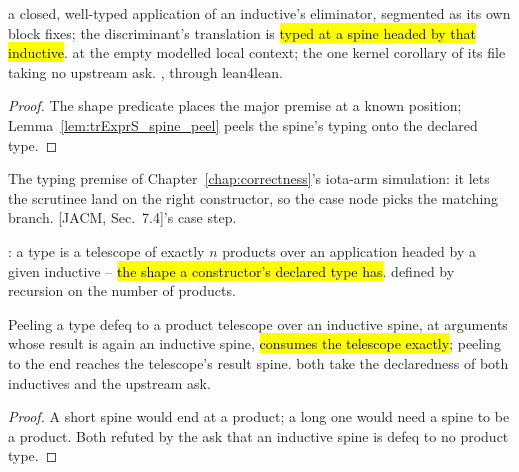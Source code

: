 \begin{theorem}
\label{thm:elim_major}
\leanok
{} a closed, well-typed application of an inductive's eliminator, segmented as its own
block fixes;
 the discriminant's translation is \hl{typed at a spine headed by that inductive}.
 at the empty modelled local context; the one kernel corollary of its file taking no
upstream ask.
 \stProved{}, \stInherited{} through lean4lean.
\end{theorem}
\begin{proof}
\leanok
{}
 The shape predicate places the major premise at a known position;
Lemma~\ref{lem:trExprS_spine_peel} peels the spine's typing onto the declared type.
\end{proof}

\begin{remark}
 The typing premise of Chapter~\ref{chap:correctness}'s iota-arm simulation: it lets the
scrutinee land on the right constructor, so the \lbox{} case node picks the matching branch. [JACM,
Sec.~7.4]'s case step.
\end{remark}

\begin{definition}
\label{def:PiSpine}
\leanok
{} : a type is a telescope of exactly $n$ products over an application
headed by a given inductive -- \hl{the shape a constructor's declared type has}.
 defined by recursion on the number of products.
\end{definition}

\begin{lemma}
\label{lem:peel_piSpine}
\leanok
{} Peeling a type defeq to a product telescope over an inductive spine, at arguments
whose result is again an inductive spine, \hl{consumes the telescope exactly}; peeling to the end
reaches the telescope's result spine.
 both take the declaredness of both inductives and the upstream ask.
\end{lemma}
\begin{proof}
\leanok
{}
 A short spine would end at a product; a long one would need a spine to be a product.
Both refuted by the ask that an inductive spine is defeq to no product type.
\end{proof}

